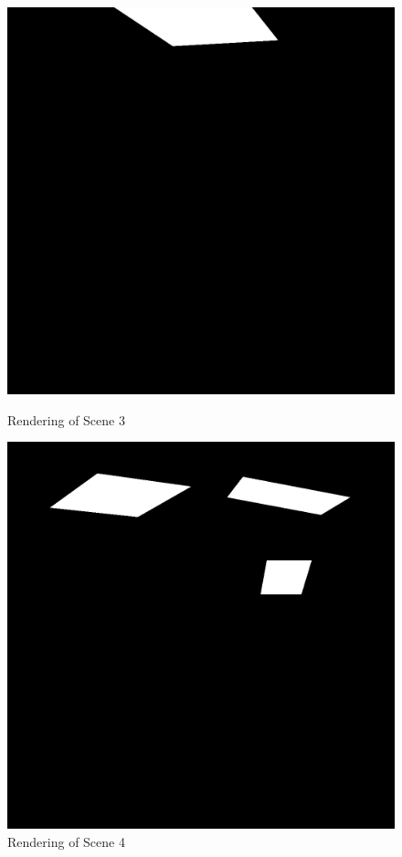 \documentclass[a4paper]{myarticle}
\begin{document}
\begin{figure}[H]
  \begin{minipage}[t]{.4\textwidth}
      \centering
      \includegraphics[width=\textwidth]{q2/scene3.png}
      \caption{Rendering of Scene 3}
  \end{minipage}
  \hfill
  \begin{minipage}[t]{.4\textwidth}
      \centering
      \includegraphics[width=\textwidth]{q2/scene4.png}
      \caption{Rendering of Scene 4}
  \end{minipage}
\end{figure}
\end{document}
